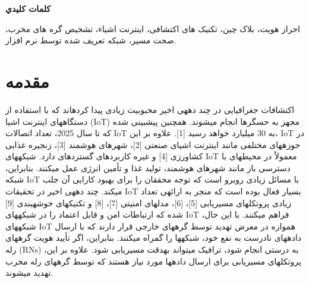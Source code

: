 \documentclass{article} %
\begin{document}
\noindent \textbf{}

\noindent \textbf{كلمات كليدي}

\noindent احراز هویت، بلاک چین، تکنیک های اکتشافی، اینترنت اشیاء، تشخیص گره های مخرب، صحت مسیر، شبکه تعریف شده توسط نرم افزار.


\section{ مقدمه}

\noindent اکتشافات جغرافیایی در چند دههی اخیر محبوبیت زیادی پیدا کردهاند که با استفاده از دستگاههای اینترنت اشیا (IoT) مجهز به حسگرها انجام میشوند. همچنین پیشبینی شده که تا سال 2025، تعداد اتصالات IoT به 30 میلیارد خواهد رسید [1]. علاوه بر این، IoT در حوزههای مختلفی مانند اینترنت اشیای صنعتی [2]، شهرهای هوشمند [3]، زنجیره غذایی کشاورزی [4] و غیره کاربردهای گستردهای دارد. شبکههای IoT معمولاً در محیطهای با دسترسی باز مانند شهرهای هوشمند، تولید غذا و تأمین انرژی عمل میکنند. بنابراین، شبکه IoT با مسائل زیادی روبرو است که توجه محققان را برای بهبود کارایی آن جلب میکند. چند دههی اخیر در تحقیقات IoT بسیار فعال بوده است که منجر به ارائهی تعداد زیادی پروتکلهای مسیریابی [5]، [6]، مدلهای امنیتی [7]، [8] و تکنیکهای خوشهبندی [9] شده که ارتباطات امن و قابل اعتماد را در شبکههای IoT فراهم میکنند. با این حال، شبکههای IoT همواره در معرض تهدید توسط گرههای خارجی قرار دارند که با ارسال دادههای نادرست به نفع خود، شبکهها را گمراه میکنند. بنابراین، اگر تأیید هویت گرههای رله (RNs)  به درستی انجام شود، ترافیک میتواند بهدقت مسیریابی شود. علاوه بر این، پروتکلهای مسیریابی برای ارسال دادهها مورد نیاز هستند که توسط گرههای رله مخرب تهدید میشوند.\textbf{}
\end{document}
